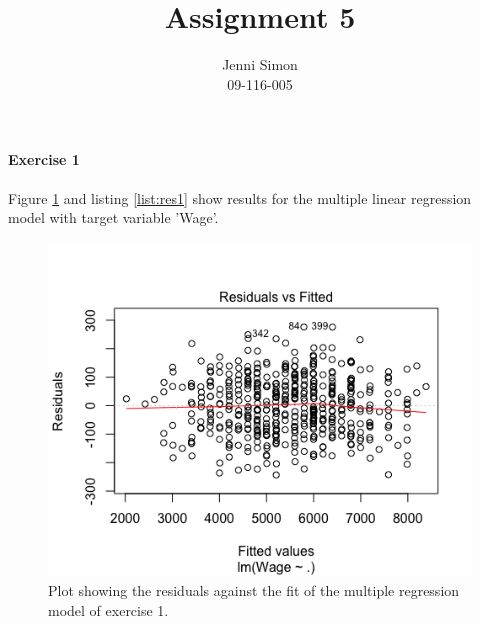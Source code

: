 \documentclass{paper}
\title{Assignment 5}
\author{Jenni Simon\\09-116-005}
\begin{document}
\maketitle


%


\paragraph{Exercise 1}

Figure \ref{fig:res1} and listing \ref{list:res1} show results for the multiple
linear regression model with target variable 'Wage'.



\begin{figure}
  \begin{center}
    \quad\quad
    \includegraphics[width=.8\linewidth]{res1}
  \end{center}
  \caption{Plot showing the residuals against the fit of the multiple regression
   model of exercise 1.}
   \label{fig:res1}
\end{figure}
\end{document}
